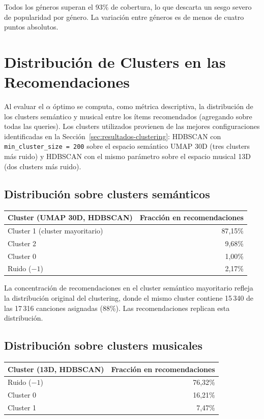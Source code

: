 Todos los géneros superan el 93\% de cobertura, lo que descarta un sesgo severo de popularidad por género. La variación entre géneros es de menos de cuatro puntos absolutos.

\section{Distribución de Clusters en las Recomendaciones}
\label{sec:cluster-distrib-extendida}

Al evaluar el $\alpha$ óptimo se computa, como métrica descriptiva, la distribución de los clusters semántico y musical entre los ítems recomendados (agregando sobre todas las queries). Los clusters utilizados provienen de las mejores configuraciones identificadas en la Sección~\ref{sec:resultados-clustering}: HDBSCAN con \texttt{min\_cluster\_size = 200} sobre el espacio semántico UMAP 30D (tres clusters más ruido) y HDBSCAN con el mismo parámetro sobre el espacio musical 13D (dos clusters más ruido).

\subsection*{Distribución sobre clusters semánticos}

\begin{center}
\begin{tabular}{lr}
    \toprule
    Cluster (UMAP 30D, HDBSCAN) & Fracción en recomendaciones \\
    \midrule
    Cluster 1 (cluster mayoritario) & 87{,}15\% \\
    Cluster 2 & 9{,}68\% \\
    Cluster 0 & 1{,}00\% \\
    Ruido ($-1$) & 2{,}17\% \\
    \bottomrule
\end{tabular}
\end{center}

La concentración de recomendaciones en el cluster semántico mayoritario refleja la distribución original del clustering, donde el mismo cluster contiene 15\,340 de las 17\,316 canciones asignadas (88\%). Las recomendaciones replican esta distribución.

\subsection*{Distribución sobre clusters musicales}

\begin{center}
\begin{tabular}{lr}
    \toprule
    Cluster (13D, HDBSCAN) & Fracción en recomendaciones \\
    \midrule
    Ruido ($-1$) & 76{,}32\% \\
    Cluster 0 & 16{,}21\% \\
    Cluster 1 & 7{,}47\% \\
    \bottomrule
\end{tabular}
\end{center}


